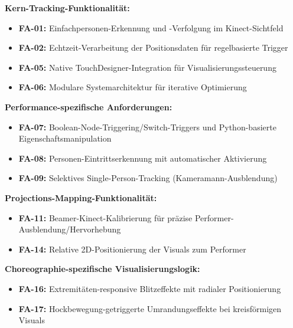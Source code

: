 \textbf{Kern-Tracking-Funktionalität:}
\begin{itemize}
    \item \textbf{FA-01:} Einfachpersonen-Erkennung und -Verfolgung im Kinect-Sichtfeld
    \item \textbf{FA-02:} Echtzeit-Verarbeitung der Positionsdaten für regelbasierte Trigger
    \item \textbf{FA-05:} Native TouchDesigner-Integration für Visualisierungssteuerung
    \item \textbf{FA-06:} Modulare Systemarchitektur für iterative Optimierung
\end{itemize}

\textbf{Performance-spezifische Anforderungen:}
\begin{itemize}
    \item \textbf{FA-07:} Boolean-Node-Triggering/Switch-Triggers und Python-basierte Eigenschaftsmanipulation
    \item \textbf{FA-08:} Personen-Eintrittserkennung mit automatischer Aktivierung
    \item \textbf{FA-09:} Selektives Single-Person-Tracking (Kameramann-Ausblendung)
\end{itemize}

\textbf{Projections-Mapping-Funktionalität:}
\begin{itemize}
    \item \textbf{FA-11:} Beamer-Kinect-Kalibrierung für präzise Performer-Ausblendung/Hervorhebung
    \item \textbf{FA-14:} Relative 2D-Positionierung der Visuals zum Performer
\end{itemize}

\textbf{Choreographie-spezifische Visualisierungslogik:}
\begin{itemize}
    \item \textbf{FA-16:} Extremitäten-responsive Blitzeffekte mit radialer Positionierung
    \item \textbf{FA-17:} Hockbewegung-getriggerte Umrandungseffekte bei kreisförmigen Visuals
\end{itemize}